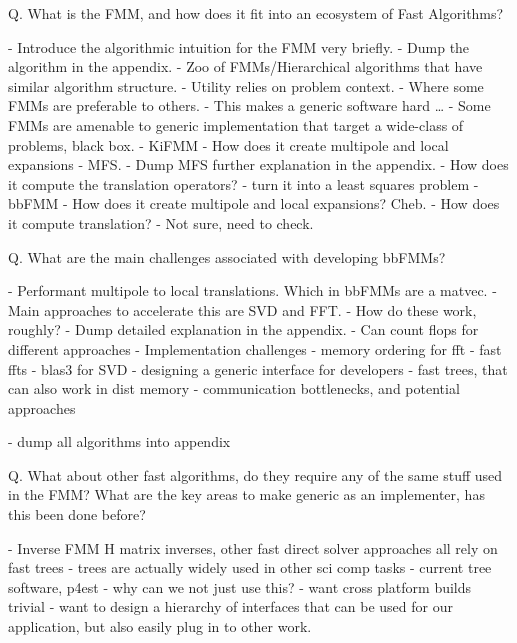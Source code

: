 Q. What is the FMM, and how does it fit into an ecosystem of Fast Algorithms?

    - Introduce the algorithmic intuition for the FMM very briefly.
        - Dump the algorithm in the appendix.
    - Zoo of FMMs/Hierarchical algorithms that have similar algorithm structure.
    - Utility relies on problem context.
        - Where some FMMs are preferable to others.
        - This makes a generic software hard \dots
    - Some FMMs are amenable to generic implementation that target a wide-class
    of problems, black box.
        - KiFMM
            - How does it create multipole and local expansions - MFS.
                - Dump MFS further explanation in the appendix.
            - How does it compute the translation operators?
                - turn it into a least squares problem
        - bbFMM
            - How does it create multipole and local expansions? Cheb.
            - How does it compute translation?
                - Not sure, need to check.

Q. What are the main challenges associated with developing bbFMMs?

    - Performant multipole to local translations. Which in bbFMMs are a matvec.
        - Main approaches to accelerate this are SVD and FFT.
        - How do these work, roughly?
            - Dump detailed explanation in the appendix.
        - Can count flops for different approaches
        - Implementation challenges
            - memory ordering for fft
            - fast ffts
            - blas3 for SVD
            - designing a generic interface for developers
            - fast trees, that can also work in dist memory
                - communication bottlenecks, and potential approaches

        - dump all algorithms into appendix

Q. What about other fast algorithms, do they require any of the same stuff used
in the FMM? What are the key areas to make generic as an implementer, has this
been done before?

    - Inverse FMM H matrix inverses, other fast direct solver approaches all
    rely on fast trees
    - trees are actually widely used in other sci comp tasks
        - current tree software, p4est
            - why can we not just use this?
                - want cross platform builds trivial
    - want to design a hierarchy of interfaces that can be used for our application,
    but also easily plug in to other work.


